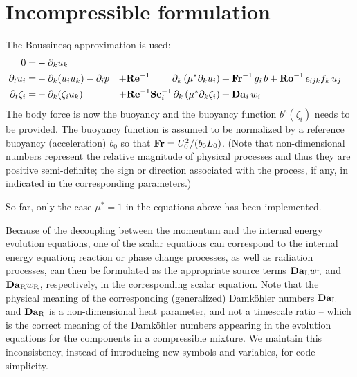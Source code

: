 \section{Incompressible formulation}

The Boussinesq approximation is used:
\begin{subequations}
  \begin{align}
    0                   =& -\partial_k u_k                                          \\
    \partial_t  u_i     =& -\partial_k ( u_i u_k )-\partial_i p                     &
    +\mathrm{\bf Re}^{-1}\qquad\;\partial_k \left( \mu^{*} \partial_k u_i\right)  &
    +\mathrm{\bf Fr}^{-1}\, g_i\,b +\mathrm{\bf Ro}^{-1}\,\epsilon_{ijk} f_k\,u_j  \\
    \partial_t \zeta_i  =& -\partial_k (\zeta_i u_k)                                &
    +\mathrm{\bf Re}^{-1}\mathrm{\bf Sc}_i^{-1}\, \partial_k \left( \mu^{*}\partial_k\zeta_i\right) &+ \mathrm{\bf Da}_i\,w_i
  \end{align}
\end{subequations}
The body force is now the buoyancy and the buoyancy function $b^e(\zeta_i)$ needs to be provided. The buoyancy function is assumed to be normalized by a reference buoyancy (acceleration) $b_0$ so that $\mathrm{\bf Fr}=U_0^2/(b_0L_0)$. (Note that non-dimensional numbers represent the relative magnitude of physical processes and thus they are positive semi-definite; the sign or direction associated with the process, if any, in indicated in the corresponding parameters.)

So far, only the case $\mu^*=1$ in the equations above has been implemented.

Because of the decoupling between the momentum and the internal energy evolution equations, one of the scalar equations can correspond to the internal energy equation; reaction or phase change processes, as well as radiation processes, can then be formulated as the appropriate source terms $\mathrm{\bf   Da}_\mathrm{L}w_\mathrm{L}$ and $\mathrm{\bf Da}_\mathrm{R}w_\mathrm{R}$, respectively, in the corresponding scalar equation. Note that the physical meaning of the corresponding (generalized) Damk{\"o}hler numbers $\mathrm{\bf   Da}_\mathrm{L}$ and $\mathrm{\bf Da}_\mathrm{R}$ is a non-dimensional heat parameter, and not a timescale ratio -- which is the correct meaning of the Damk{\"o}hler numbers appearing in the evolution equations for the components in a compressible mixture. We maintain this inconsistency, instead of introducing new symbols and variables, for code simplicity.


